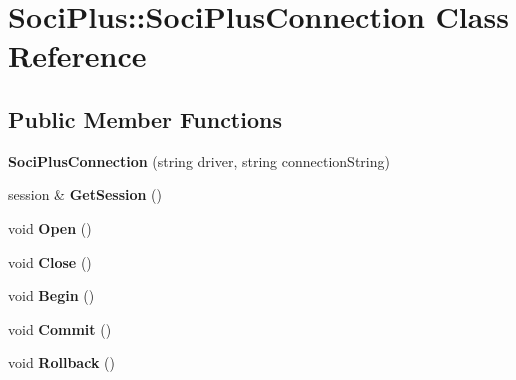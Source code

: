 \hypertarget{class_soci_plus_1_1_soci_plus_connection}{\section{Soci\+Plus\+:\+:Soci\+Plus\+Connection Class Reference}
\label{class_soci_plus_1_1_soci_plus_connection}
}
\subsection*{Public Member Functions}
\begin{DoxyCompactItemize}
\item 
\hypertarget{class_soci_plus_1_1_soci_plus_connection_ae6ddbdb3d9b9c247c76b2e48cf4ae7d7}{{\bfseries Soci\+Plus\+Connection} (string driver, string connection\+String)}\label{class_soci_plus_1_1_soci_plus_connection_ae6ddbdb3d9b9c247c76b2e48cf4ae7d7}

\item 
\hypertarget{class_soci_plus_1_1_soci_plus_connection_a77b4950b22541ccd7d9278389919e51b}{session \& {\bfseries Get\+Session} ()}\label{class_soci_plus_1_1_soci_plus_connection_a77b4950b22541ccd7d9278389919e51b}

\item 
\hypertarget{class_soci_plus_1_1_soci_plus_connection_afeb82c426513a4a735809bdd6ff24daa}{void {\bfseries Open} ()}\label{class_soci_plus_1_1_soci_plus_connection_afeb82c426513a4a735809bdd6ff24daa}

\item 
\hypertarget{class_soci_plus_1_1_soci_plus_connection_a4681c2cd9bbfe6c4502b76b687ab0b27}{void {\bfseries Close} ()}\label{class_soci_plus_1_1_soci_plus_connection_a4681c2cd9bbfe6c4502b76b687ab0b27}

\item 
\hypertarget{class_soci_plus_1_1_soci_plus_connection_ae71f7b2a44a7c23b11217c8d7cabbec9}{void {\bfseries Begin} ()}\label{class_soci_plus_1_1_soci_plus_connection_ae71f7b2a44a7c23b11217c8d7cabbec9}

\item 
\hypertarget{class_soci_plus_1_1_soci_plus_connection_afc0284ab52d9a36939fe239fe35f0e94}{void {\bfseries Commit} ()}\label{class_soci_plus_1_1_soci_plus_connection_afc0284ab52d9a36939fe239fe35f0e94}

\item 
\hypertarget{class_soci_plus_1_1_soci_plus_connection_a364bafdc70ca2bd98d9a726ad4490aa1}{void {\bfseries Rollback} ()}\label{class_soci_plus_1_1_soci_plus_connection_a364bafdc70ca2bd98d9a726ad4490aa1}


\end{DoxyCompactItemize}
